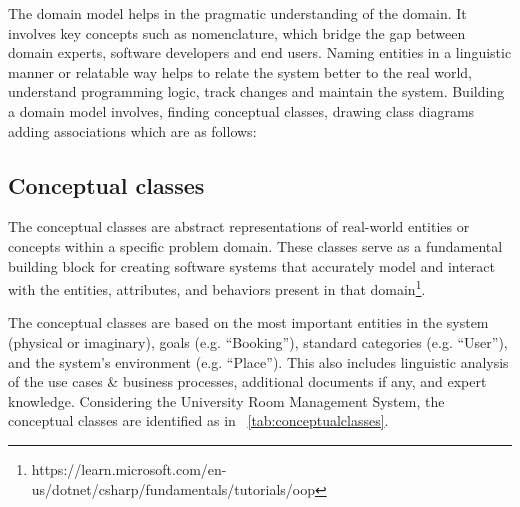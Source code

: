 \documentclass[article,onecolumn]{IEEEtran}
\begin{document}
	The domain model helps in the pragmatic understanding of the domain. It involves key concepts such as nomenclature, which bridge the gap between domain experts, software developers and end users. Naming entities in a linguistic manner or relatable way helps to relate the system better to the real world, understand programming logic, track changes and maintain the system. Building a domain model involves, finding conceptual classes, drawing class diagrams adding associations which are as follows:



\subsection{Conceptual classes} \label{sec:conceptualclasses}
	The conceptual classes are abstract representations of real-world entities or concepts within a specific problem domain. These classes serve as a fundamental building block for creating software systems that accurately model and interact with the entities, attributes, and behaviors present in that domain\footnote{https://learn.microsoft.com/en-us/dotnet/csharp/fundamentals/tutorials/oop}.


	The conceptual classes are based on the most important entities in the system (physical or imaginary), goals (e.g. ``Booking''), standard categories (e.g. ``User''), and the system's environment (e.g. ``Place''). This also includes linguistic analysis of the use cases \& business processes, additional documents if any, and expert knowledge. Considering the University Room Management System, the conceptual classes are identified as in \tablename~\ref{tab:conceptualclasses}.
\end{document}
